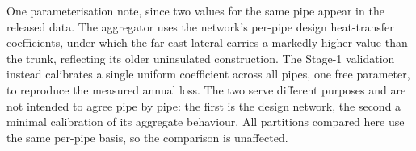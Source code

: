 One parameterisation note, since two values for the same pipe appear in the released data.
The aggregator uses the network's per-pipe design heat-transfer coefficients, under which
the far-east lateral carries a markedly higher value than the trunk, reflecting its older
uninsulated construction. The Stage-1 validation instead calibrates a single uniform
coefficient across all pipes, one free parameter, to reproduce the measured annual loss.
The two serve different purposes and are not intended to agree pipe by pipe: the first is
the design network, the second a minimal calibration of its aggregate behaviour. All
partitions compared here use the same per-pipe basis, so the comparison is unaffected.
